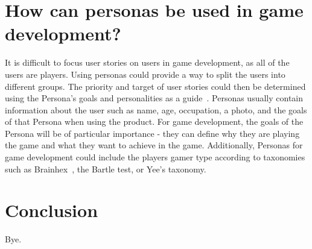 \documentclass{scrartcl}
\begin{document}
\section{How can personas be used in game development?}
It is difficult to focus user stories on users in game development, as all of the users are players. Using personas could provide a way to split the users into different groups. The priority and target of user stories could then be determined using the Persona's goals and personalities as a guide~\cite{microsoft thing}. Personas usually contain information about the user such as name, age, occupation, a photo, and the goals of that Persona when using the product. For game development, the goals of the Persona will be of particular importance - they can define why they are playing the game and what they want to achieve in the game. Additionally, Personas for game development could include the players gamer type according to taxonomies such as Brainhex~\cite{}, the Bartle test\cite{}, or Yee's taxonomy\cite{}.
\begin{flushright}

\end{flushright}

\section{Conclusion}
Bye.



\end{document}
